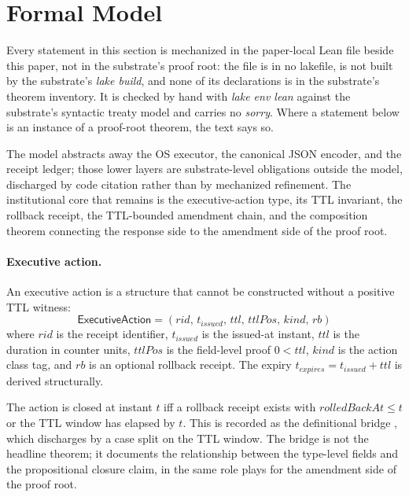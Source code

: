 \section{Formal Model}
\label{sec:model-ra}

Every statement in this section is mechanized in the paper-local Lean
file beside this paper, not in the substrate's proof root: the file is
in no lakefile, is not built by the substrate's \emph{lake build}, and
none of its declarations is in the substrate's theorem inventory. It is
checked by hand with \emph{lake env lean} against the substrate's
syntactic treaty model and carries no \emph{sorry}. Where a statement
below is an instance of a proof-root theorem, the text says so.

The model abstracts away the OS executor, the canonical JSON encoder,
and the receipt ledger; those lower layers are substrate-level
obligations outside the model, discharged by code citation rather than
by mechanized refinement. The institutional core that remains is the
executive-action type, its TTL invariant, the rollback receipt, the
TTL-bounded amendment chain, and the composition theorem connecting
the response side to the amendment side of the proof root.

\paragraph{Executive action.}
An executive action is a structure that cannot be constructed without
a positive TTL witness:
\[
  \mathsf{ExecutiveAction} =
  (\mathit{rid},\,\mathit{t_{\text{issued}}},\,\mathit{ttl},\,
   \mathit{ttlPos},\,\mathit{kind},\,\mathit{rb})
\]
where $\mathit{rid}$ is the receipt identifier, $\mathit{t_{\text{issued}}}$
is the issued-at instant, $\mathit{ttl}$ is the duration in counter
units, $\mathit{ttlPos}$ is the field-level proof $0 < \mathit{ttl}$,
$\mathit{kind}$ is the action class tag, and $\mathit{rb}$ is an
optional rollback receipt. The expiry $\mathit{t_{\text{expires}}} =
\mathit{t_{\text{issued}}} + \mathit{ttl}$ is derived structurally.

The action is closed at instant $t$ iff a rollback receipt exists with
$\mathit{rolledBackAt} \le t$ or the TTL window has elapsed by $t$.
This is recorded as the definitional bridge
, which discharges by a
case split on the TTL window. The bridge is
not the headline theorem; it documents the relationship between the
type-level fields and the propositional closure claim, in the same
role  plays for the
amendment side of the proof root.

